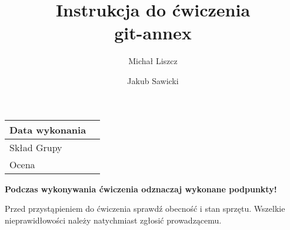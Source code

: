 \documentclass[polish]{article}
\title{\textbf{Instrukcja do ćwiczenia}\\git-annex}
\author{Michał Liszcz \and Jakub Sawicki}
\begin{document}
\maketitle

\begin{tabular}{|l|p{}|}
\hline
Data wykonania & \\
\hline
Skład Grupy & \\
\hline
Ocena & \\
\hline
\end{tabular}

\vspace{0.5cm}
\noindent \textbf{Podczas wykonywania ćwiczenia odznaczaj wykonane podpunkty!}

\noindent Przed przystąpieniem do ćwiczenia sprawdź obecność i stan sprzętu.
Wszelkie nieprawidłowości należy natychmiast zgłosić prowadzącemu.
\vspace{0.5cm}

\renewcommand{\labelenumi}{$\Box$~\texttt{\theenumi}}
\renewcommand{\labelenumii}{$\Box$~\texttt{\theenumii}}


\end{document}
